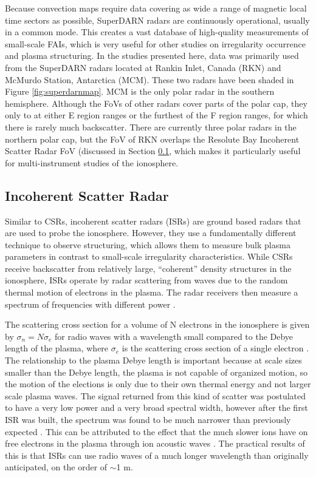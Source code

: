 Because convection maps require data covering as wide a range of magnetic local time sectors as possible, SuperDARN radars are continuously operational, usually in a common mode.  This creates a vast database of high-quality measurements of small-scale FAIs, which is very useful for other studies on irregularity occurrence and plasma structuring.  In the studies presented here, data was primarily used from the SuperDARN radars located at Rankin Inlet, Canada (RKN) and McMurdo Station, Antarctica (MCM).  These two radars have been shaded in Figure \ref{fig:superdarnmap}.  MCM is the only polar radar in the southern hemisphere.  Although the FoVs of other radars cover parts of the polar cap, they only to at either E region ranges or the furthest of the F region ranges, for which there is rarely much backscatter.  There are currently three polar radars in the northern polar cap, but the FoV of RKN overlaps the Resolute Bay Incoherent Scatter Radar FoV (discussed in Section \ref{sec:isr}, which makes it particularly useful for multi-instrument studies of the ionosphere.

\subsection{Incoherent Scatter Radar}
\label{sec:isr}
Similar to CSRs, incoherent scatter radars (ISRs) are ground based radars that are used to probe the ionosphere.  However, they use a fundamentally different technique to observe structuring, which allows them to measure bulk plasma parameters in contrast to small-scale irregularity characteristics.  While CSRs receive backscatter from relatively large, ``coherent'' density structures in the ionosphere, ISRs operate by radar scattering from waves due to the random thermal motion of electrons in the plasma.  The radar receivers then measure a spectrum of frequencies with different power \citep{Gordon1958}.

The scattering cross section for a volume of N electrons in the ionosphere is given by \(\sigma_n = N \sigma_e\) for radio waves with a wavelength small compared to the Debye length of the plasma, where \(\sigma_e\) is the scattering cross section of a single electron \citep{Gordon1958,Fejer1960}.  The relationship to the plasma Debye length is important because at scale sizes smaller than the Debye length, the plasma is not capable of organized motion, so the motion of the elections is only due to their own thermal energy and not larger scale plasma waves.  The signal returned from this kind of scatter was postulated to have a very low power and a very broad spectral width, however after the first ISR was built, the spectrum was found to be much narrower than previously expected \citep{Evans1969}.  This can be attributed to the effect that the much slower ions have on free electrons in the plasma through ion acoustic waves \citep{Bowles1958}.  The practical results of this is that ISRs can use radio waves of a much longer wavelength than originally anticipated, on the order of \(\sim\)1 m.

